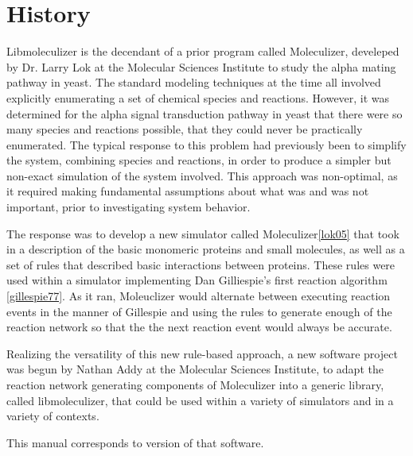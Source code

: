 \section{History}

Libmoleculizer is the decendant of a prior program called Moleculizer,
develeped by Dr. Larry Lok at the Molecular Sciences Institute to
study the alpha mating pathway in yeast. The standard modeling
techniques at the time all involved explicitly enumerating a set of
chemical species and reactions. However, it was determined for the
alpha signal transduction pathway in yeast that there were so many
species and reactions possible, that they could never be practically
enumerated. The typical response to this problem had previously been
to simplify the system, combining species and reactions, in order to
produce a simpler but non-exact simulation of the system
involved. This approach was non-optimal, as it required making
fundamental assumptions about what was and was not important, prior to
investigating system behavior.

The response was to develop a new simulator called
Moleculizer\ref{lok05} that took in a description of the basic
monomeric proteins and small molecules, as well as a set of rules that
described basic interactions between proteins. These rules were used
within a simulator implementing Dan Gilliespie's first reaction
algorithm \ref{gillespie77}.  As it ran, Moleuclizer would alternate
between executing reaction events in the manner of Gillespie and using
the rules to generate enough of the reaction network so that the
 the next reaction event would always be accurate.

Realizing the versatility of this new rule-based approach, a new
software project was begun by Nathan Addy at the Molecular Sciences
Institute, to adapt the reaction network generating components of
Moleculizer into a generic library, called libmoleculizer, that could
be used within a variety of simulators and in a variety of contexts.

This manual corresponds to version \currentversion of that software. 